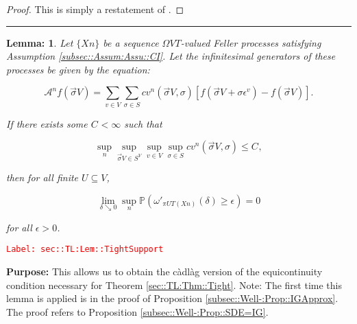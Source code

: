 \documentclass[12pt]{article}
\newcommand{\mb}{\mathbb}
\newcommand{\mc}{\mathcal}
\newcommand{\ep}{\epsilon}
\newcommand{\tr}{\textcolor{red}}
\newcommand{\labe}[1]{\tr{\texttt{Label: #1}}}
\newcommand{\purpose}{\textbf{Purpose: }}
\newcommand{\lin}{\rule{\linewidth}{0.4 pt}}
\newcommand{\pr}{\mb{P}}							%
\renewcommand{\v}{v}							%
\renewcommand{\U}{U}							%
\renewcommand{\S}{S}							%
\newcommand{\s}{\sigma}							%
\newcommand{\sv}{\vec{\s}}						%
\newcommand{\ev}[1]{\ep^{#1}}					%
\newcommand{\T}{T}								%
\newcommand{\proj}{\pi}							%
\newcommand{\X}{X}								%
\newcommand{\IG}{\mc{A}}						%
\newcommand{\IGr}{c}							%
\newcommand{\pup}[1]{^{#1}}							%
\newcommand{\V}{V}									%
\newcommand{\numb}{n}								%
\newcommand{\XState}[1]{\S^{#1}}				%
\newcommand{\const}[1]{C_{#1}}						%
\newtheorem{lem}[thms]{Lemma: }
\begin{document}
\begin{proof}
This is simply a restatement of \cite[Theorem 13.2]{Bil99}.
\end{proof}

\lin

\begin{lem}
Let \(\{\X{}{}{\numb}\}\) be a sequence \(\Omega{\V}{\T}\)-valued Feller processes satisfying Assumption \ref{subsec::Assum:Assu::CI}. Let the infinitesimal generators of these processes be given by the equation:

\[\IG\pup{\numb}f(\sv{}{\V}) = \sum_{\v\in \V}\sum_{\s \in \S} \IGr{\v}\pup{\numb}(\sv{}{\V},\s)[f(\sv{}{\V} + \s\ev{\v}) - f(\sv{}{\V})].\]

If there exists some \(\const{} < \infty\) such that

\[\sup_{\numb}\sup_{\sv{}{\V}\in \S^\V}\sup_{\v\in\V}\sup_{\s\in \S} \IGr{\v}\pup{\numb}(\sv{}{\V},\s) \leq \const{},\]

then for all finite \(\U \subseteq \V\),

\[\lim_{\delta \searrow 0} \sup_\numb \pr\left(\omega'_{\proj{\U}{\T}\left(\X{}{}{\numb}\right)}(\delta) \geq \ep\right) = 0\]

for all \(\ep > 0\).
\label{sec::TL:Lem::TightSupport}
\end{lem}
\labe{sec::TL:Lem::TightSupport}

\purpose This allows us to obtain the c\`adl\`ag version of the equicontinuity condition necessary for Theorem \ref{sec::TL:Thm::Tight}. Note: The first time this lemma is applied is in the proof of Proposition \ref{subsec::Well-:Prop::IGApprox}. The proof refers to Proposition \ref{subsec::Well-:Prop::SDE=IG}.
\end{document}
